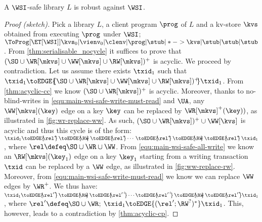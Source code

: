 \begin{theorem}
 \label{thm:main-wsi-robust}
    A \(\WSI\)-safe library \( L \) is robust against \(\WSI\).   
\end{theorem}
\SpaceBelowDef
%

%
\begin{proof}[Proof (sketch)]
Pick a library \( L \), a client program \( \prog \) of  $L$ and a kv-store \( \kvs \) obtained from executing \( \prog \) under $\WSI$;
\ie \( \ToProg[{\ET[\WSI]}]{\kvs_0 | \vienv_0 | \clenv | \prog | \stub | * -> \kvs | \stub | \stub | \stub }\).
From \cref{thm:serialisable_nocycle} it suffices to prove that $(\SO \cup \WR[\mkvs] \cup \WW[\mkvs] \cup \RW[\mkvs])^{+}$ is acyclic.
We proceed by contradiction.
Let us assume there exists $\txid_1$ such that $\txid_1 \toEDGE{\!\!(\SO \cup \WR[\mkvs] \cup \WW[\mkvs] \cup \RW[\mkvs])^{+}\!\!} \txid_1$. 
From \cref{thm:acyclic-cc} we know \( (\SO \cup \WR[\mkvs])^{+} \) is acyclic.
Moreover, thanks to no-blind-writes in \eqref{equ:main-wsi-safe-write-must-read} and \( \UA \),
any \( \WW[\mkvs](\key)\) edge on a key \( \key \) can be replaced by \( \WR[\mkvs]^{+}(\key) ) \), 
as illustrated in \cref{fig:wr-replace-ww}.
As such, \( (\SO \cup \WR[\mkvs])^{+} \cup \WW[\kvs]\) is acyclic and thus this cycle is of the form:
\(
    \txid_1 \toEDGE{\!\!\rel^*\!\!} \,\toEDGE{\!\!\RW\!\!}\, \toEDGE{\!\!\rel^*\!\!} \cdots \,\toEDGE{\!\!\rel^*\!\!}\, \toEDGE{\!\!\RW\!\!}\, \toEDGE{\!\!\rel^*\!\!}\, \txid_1
\),
where \( \rel \defeq \SO \cup \WR \cup \WW \).
From \eqref{equ:main-wsi-safe-all-write} we know 
an \( \RW[\mkvs](\key_1) \) edge on a key \( \key_1 \) starting from 
a writing transaction \( \txid \) can be replaced by a \( \WW \) edge,
as illustrated in \cref{fig:ww-replace-rw}.
Moreover, from \eqref{equ:main-wsi-safe-write-must-read} we know we can replace \( \WW \) edges by \( \WR^+ \).
We thus have:
\(
    \txid_1 \toEDGE{\!\!{\rel'}^*\!\!} \,\toEDGE{\!\!\RW\!\!}\, \toEDGE{\!\!{\rel'}^+\!\!} \cdots \toEDGE{\!\!{\rel'}^+\!\!} \,\toEDGE{\!\!\RW\!\!} \,\toEDGE{\!\!{\rel'}^*\!\!} \txid_1
\),
where \( \rel' \defeq \SO \cup \WR  \);
\ie \( \txid_1 \toEDGE{( \rel'; \RW^? )^* } \txid_1 \).
This, however, leads to a contradiction by \cref{thm:acyclic-cp}.
\renewcommand{\qed}{}
\end{proof}

